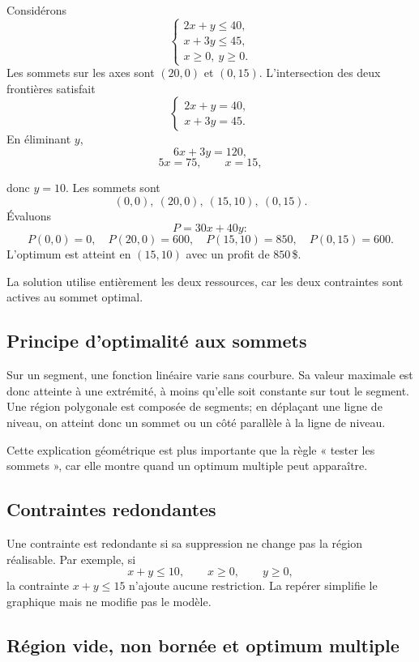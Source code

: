 \documentclass[12pt,a4paper,openany]{book}
\begin{document}
Considérons
\[
\begin{cases}
2x+y\leq40,\\
x+3y\leq45,\\
x\geq0,\ y\geq0.
\end{cases}
\]
Les sommets sur les axes sont $(20,0)$ et $(0,15)$. L'intersection des deux frontières satisfait
\[
\begin{cases}
2x+y=40,\\
x+3y=45.
\end{cases}
\]
En éliminant $y$,
\[
6x+3y=120,
\]
\[
5x=75,
\qquad x=15,
\]

donc $y=10$. Les sommets sont
\[
(0,0),\ (20,0),\ (15,10),\ (0,15).
\]
Évaluons
\[
P=30x+40y:
\]
\[
P(0,0)=0,
\quad
P(20,0)=600,
\quad
P(15,10)=850,
\quad
P(0,15)=600.
\]
L'optimum est atteint en $(15,10)$ avec un profit de $850\,$\$.

La solution utilise entièrement les deux ressources, car les deux contraintes sont actives au sommet optimal.

\subsection{Principe d'optimalité aux sommets}

Sur un segment, une fonction linéaire varie sans courbure. Sa valeur maximale est donc atteinte à une extrémité, à moins qu'elle soit constante sur tout le segment. Une région polygonale est composée de segments; en déplaçant une ligne de niveau, on atteint donc un sommet ou un côté parallèle à la ligne de niveau.

Cette explication géométrique est plus importante que la règle « tester les sommets », car elle montre quand un optimum multiple peut apparaître.

\subsection{Contraintes redondantes}

Une contrainte est redondante si sa suppression ne change pas la région réalisable. Par exemple, si
\[
x+y\leq10,
\qquad x\geq0,
\qquad y\geq0,
\]
la contrainte $x+y\leq15$ n'ajoute aucune restriction. La repérer simplifie le graphique mais ne modifie pas le modèle.

\subsection{Région vide, non bornée et optimum multiple}
\end{document}
